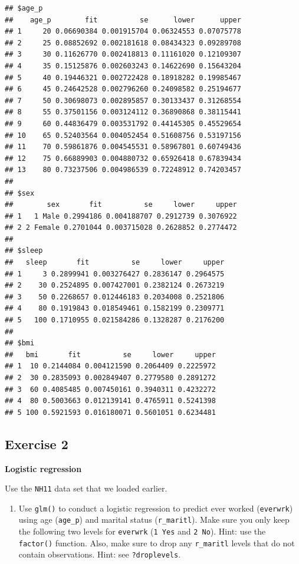 \documentclass[]{book}
\providecommand{\tightlist}{%
  \setlength{\itemsep}{0pt}\setlength{\parskip}{0pt}}
\begin{document}
\begin{verbatim}
## $age_p
##    age_p        fit          se      lower      upper
## 1     20 0.06690384 0.001915704 0.06324553 0.07075778
## 2     25 0.08852692 0.002181618 0.08434323 0.09289708
## 3     30 0.11626770 0.002418813 0.11161020 0.12109307
## 4     35 0.15125876 0.002603243 0.14622690 0.15643204
## 5     40 0.19446321 0.002722428 0.18918282 0.19985467
## 6     45 0.24642528 0.002796260 0.24098582 0.25194677
## 7     50 0.30698073 0.002895857 0.30133437 0.31268554
## 8     55 0.37501156 0.003124112 0.36890868 0.38115441
## 9     60 0.44836479 0.003531792 0.44145305 0.45529654
## 10    65 0.52403564 0.004052454 0.51608756 0.53197156
## 11    70 0.59861876 0.004545531 0.58967801 0.60749436
## 12    75 0.66889903 0.004880732 0.65926418 0.67839434
## 13    80 0.73237506 0.004986539 0.72248912 0.74203457
## 
## $sex
##        sex       fit          se     lower     upper
## 1   1 Male 0.2994186 0.004188707 0.2912739 0.3076922
## 2 2 Female 0.2701044 0.003715028 0.2628852 0.2774472
## 
## $sleep
##   sleep       fit          se     lower     upper
## 1     3 0.2899941 0.003276427 0.2836147 0.2964575
## 2    30 0.2524895 0.007427001 0.2382124 0.2673219
## 3    50 0.2268657 0.012446183 0.2034008 0.2521806
## 4    80 0.1919843 0.018549461 0.1582199 0.2309771
## 5   100 0.1710955 0.021584286 0.1328287 0.2176200
## 
## $bmi
##   bmi       fit          se     lower     upper
## 1  10 0.2144084 0.004121590 0.2064409 0.2225972
## 2  30 0.2835093 0.002849407 0.2779580 0.2891272
## 3  60 0.4085485 0.007450161 0.3940311 0.4232272
## 4  80 0.5003663 0.012139141 0.4765911 0.5241398
## 5 100 0.5921593 0.016180071 0.5601051 0.6234481
\end{verbatim}

\hypertarget{exercise-2}{%
\subsection{Exercise 2}\label{exercise-2}}

\textbf{Logistic regression}

Use the \texttt{NH11} data set that we loaded earlier.

\begin{enumerate}
\def\labelenumi{\arabic{enumi}.}
\tightlist
\item
  Use \texttt{glm()} to conduct a logistic regression to predict ever worked (\texttt{everwrk}) using age (\texttt{age\_p}) and marital status (\texttt{r\_maritl}). Make sure you only keep the following two levels for \texttt{everwrk} (\texttt{1\ Yes} and \texttt{2\ No}). Hint: use the \texttt{factor()} function. Also, make sure to drop any \texttt{r\_maritl} levels that do not contain observations. Hint: see \texttt{?droplevels}.
\end{enumerate}
\end{document}
